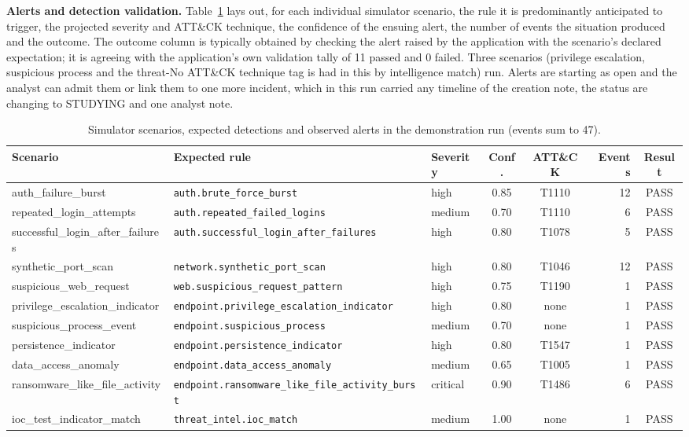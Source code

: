 \documentclass[conference]{IEEEtran}
\newcommand{\code}[1]{\texttt{#1}}
\begin{document}
\textbf{Alerts and detection validation.} Table~\ref{tab:demoalerts} lays out, for each individual simulator scenario, the rule it is predominantly anticipated to trigger, the projected severity and ATT\&CK technique, the confidence of the ensuing alert, the number of events the situation produced and the outcome. The outcome column is typically obtained by checking the alert raised by the application with the scenario's declared expectation; it is agreeing with the application's own validation tally of 11 passed and 0 failed. Three scenarios (privilege escalation, suspicious process and the threat-No ATT\&CK technique tag is had in this by intelligence match) run. Alerts are starting as open and the analyst can admit them or link them to one more incident, which in this run carried any timeline of the creation note, the status are changing to STUDYING and one analyst note.

\begin{table}[t]
\caption{Simulator scenarios, expected detections and observed alerts in the demonstration run (events sum to 47).}
\label{tab:demoalerts}
\centering
\footnotesize
\begin{tabular}{@{}l l l c c r c@{}}
\toprule
Scenario & Expected rule & Severity & Conf. & ATT\&CK & Events & Result \\
\midrule
auth\_failure\_burst & \code{auth.brute\_force\_burst} & high & 0.85 & T1110 & 12 & PASS \\
repeated\_login\_attempts & \code{auth.repeated\_failed\_logins} & medium & 0.70 & T1110 & 6 & PASS \\
successful\_login\_after\_failures & \code{auth.successful\_login\_after\_failures} & high & 0.80 & T1078 & 5 & PASS \\
synthetic\_port\_scan & \code{network.synthetic\_port\_scan} & high & 0.80 & T1046 & 12 & PASS \\
suspicious\_web\_request & \code{web.suspicious\_request\_pattern} & high & 0.75 & T1190 & 1 & PASS \\
privilege\_escalation\_indicator & \code{endpoint.privilege\_escalation\_indicator} & high & 0.80 & none & 1 & PASS \\
suspicious\_process\_event & \code{endpoint.suspicious\_process} & medium & 0.70 & none & 1 & PASS \\
persistence\_indicator & \code{endpoint.persistence\_indicator} & high & 0.80 & T1547 & 1 & PASS \\
data\_access\_anomaly & \code{endpoint.data\_access\_anomaly} & medium & 0.65 & T1005 & 1 & PASS \\
ransomware\_like\_file\_activity & \code{endpoint.ransomware\_like\_file\_activity\_burst} & critical & 0.90 & T1486 & 6 & PASS \\
ioc\_test\_indicator\_match & \code{threat\_intel.ioc\_match} & medium & 1.00 & none & 1 & PASS \\
\bottomrule
\end{tabular}
\end{table}
\end{document}
